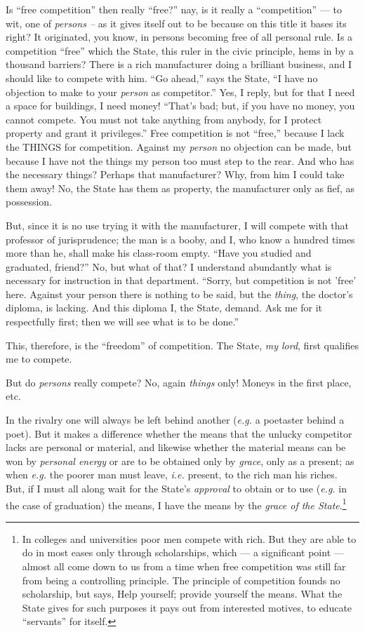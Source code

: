 Is ``free competition'' then really ``free?'' nay, is it really a 
``competition'' --- to wit, one of \textit{persons --} as it gives itself out 
to be because on this title it bases its right? It originated, you know, in 
persons becoming free of all personal rule. Is a competition ``free'' which 
the State, this ruler in the civic principle, hems in by a thousand barriers? 
There is a rich manufacturer doing a brilliant business, and I should like to 
compete with him. ``Go ahead,'' says the State, ``I have no objection to 
make to your \textit{person} as competitor.'' Yes, I reply, but for that I 
need a space for buildings, I need money! ``That's bad; but, if you have no 
money, you cannot compete. You must not take anything from anybody, for I 
protect property and grant it privileges.'' Free competition is not 
``free,'' because I lack the THINGS for competition. Against my 
\textit{person} no objection can be made, but because I have not the things my 
person too must step to the rear. And who has the necessary things? Perhaps 
that manufacturer? Why, from him I could take them away! No, the State has 
them as property, the manufacturer only as fief, as possession.

But, since it is no use trying it with the manufacturer, I will compete with 
that professor of jurisprudence; the man is a booby, and I, who know a hundred 
times more than he, shall make his class-room empty. ``Have you studied and 
graduated, friend?'' No, but what of that? I understand abundantly what is 
necessary for instruction in that department. ``Sorry, but competition is not 
'free' here. Against your person there is nothing to be said, but the 
\textit{thing}, the doctor's diploma, is lacking. And this diploma I, the 
State, demand. Ask me for it respectfully first; then we will see what is to 
be done.''

This, therefore, is the ``freedom'' of competition. The State, \textit{my 
lord}, first qualifies me to compete.

But do \textit{persons} really compete? No, again \textit{things} only! Moneys 
in the first place, etc.

In the rivalry one will always be left behind another (\textit{e.g.} a 
poetaster behind a poet). But it makes a difference whether the means that the 
unlucky competitor lacks are personal or material, and likewise whether the 
material means can be won by \textit{personal energy} or are to be obtained 
only by \textit{grace}, only as a present; as when \textit{e.g.} the poorer 
man must leave, \textit{i.e.} present, to the rich man his riches. But, if I 
must all along wait for the State's \textit{approval} to obtain or to use 
(\textit{e.g.} in the case of graduation) the means, I have the means by the 
\textit{grace of the State}.\footnote{In colleges and universities poor men 
compete with rich. But they are able to do in most eases only through 
scholarships, which --- a significant point --- almost all come down to us from 
a time when free competition was still far from being a controlling principle. 
The principle of competition founds no scholarship, but says, Help yourself; 
provide yourself the means. What the State gives for such purposes it pays out 
from interested motives, to educate ``servants'' for itself.}

